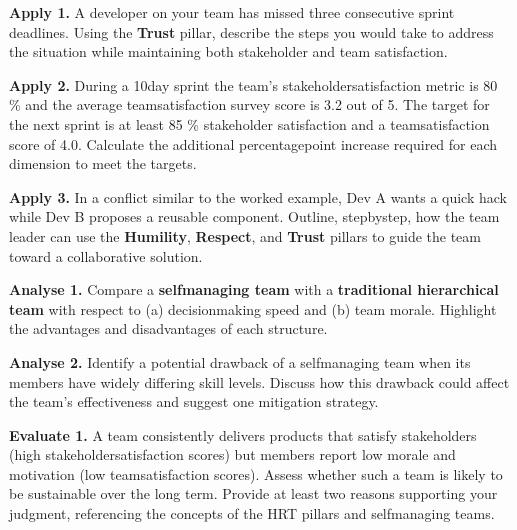 \documentclass[12pt, a4paper]{article}
\begin{document}
\newpage

\noindent \textbf{Apply 1.}  
A developer on your team has missed three consecutive sprint deadlines. Using the \textbf{Trust} pillar, describe the steps you would take to address the situation while maintaining both stakeholder and team satisfaction.

\newpage

\noindent \textbf{Apply 2.}  
During a 10day sprint the team's stakeholdersatisfaction metric is 80 \% and the average teamsatisfaction survey score is 3.2 out of 5. The target for the next sprint is at least 85 \% stakeholder satisfaction and a teamsatisfaction score of 4.0.  
Calculate the additional percentagepoint increase required for each dimension to meet the targets.

\newpage

\noindent \textbf{Apply 3.}  
In a conflict similar to the worked example, Dev A wants a quick hack while Dev B proposes a reusable component. Outline, stepbystep, how the team leader can use the \textbf{Humility}, \textbf{Respect}, and \textbf{Trust} pillars to guide the team toward a collaborative solution.

\newpage

\noindent \textbf{Analyse 1.}  
Compare a \textbf{selfmanaging team} with a \textbf{traditional hierarchical team} with respect to (a) decisionmaking speed and (b) team morale. Highlight the advantages and disadvantages of each structure.

\newpage

\noindent \textbf{Analyse 2.}  
Identify a potential drawback of a selfmanaging team when its members have widely differing skill levels. Discuss how this drawback could affect the team's effectiveness and suggest one mitigation strategy.

\newpage

\noindent \textbf{Evaluate 1.}  
A team consistently delivers products that satisfy stakeholders (high stakeholdersatisfaction scores) but members report low morale and motivation (low teamsatisfaction scores). Assess whether such a team is likely to be sustainable over the long term. Provide at least two reasons supporting your judgment, referencing the concepts of the HRT pillars and selfmanaging teams.

\newpage
\end{document}
